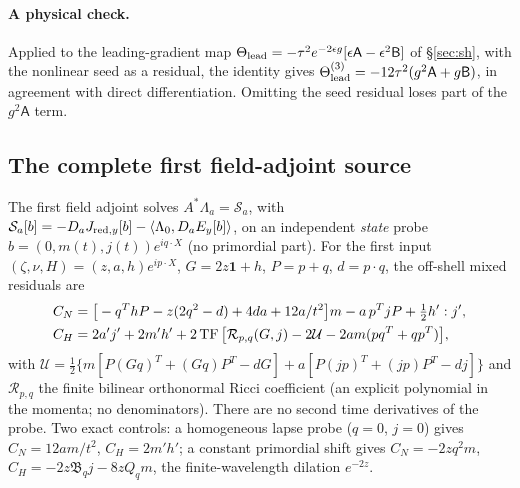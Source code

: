 \paragraph{A physical check.} Applied to the leading-gradient map
$\Theta_{\rm lead}=-\tau^2e^{-2\epsilon g}[\epsilon\mathsf A-\epsilon^2\mathsf B]$ of \S\ref{sec:sh}, with the
nonlinear seed as a residual, the identity gives $\Theta^{(3)}_{\rm lead}=-12\tau^2(g^2\mathsf A+g\mathsf B)$,
in agreement with direct differentiation. Omitting the seed residual loses part of the
$g^2\mathsf A$ term.

\subsection{The complete first field-adjoint source}\label{sec:first-source}
The first field adjoint solves $A^*\Lambda_a=\mathcal S_a$, with
$\mathcal S_a[b]=-D_aJ_{{\rm red},y}[b]-\langle\Lambda_0,D_aE_y[b]\rangle$, on an independent
\emph{state} probe $b=(0,m(t),j(t))e^{iq\cdot X}$ (no primordial part). For the first input
$(\zeta,\nu,H)=(z,a,h)e^{ip\cdot X}$, $G=2z\mathbf 1+h$, $P=p+q$, $d=p\cdot q$, the off-shell
mixed residuals are
\begin{equation}\label{eq:mixed-residuals}
\begin{split}
 C_N&=\big[-q^ThP-z(2q^2-d)+4da+12a/t^2\big]m-a\,p^TjP+\tfrac12h':j',\\
 C_H&=2a'j'+2m'h'+2\operatorname{TF}\big[\mathcal R_{p,q}(G,j)-2\mathcal U-2am(pq^T+qp^T)\big],
\end{split}
\end{equation}
with $\mathcal U=\frac12\{m[P(Gq)^T+(Gq)P^T-dG]+a[P(jp)^T+(jp)P^T-dj]\}$ and
$\mathcal R_{p,q}$ the finite bilinear orthonormal Ricci coefficient (an explicit polynomial in
the momenta; no denominators). There are no second time derivatives of the probe. Two exact
controls: a homogeneous lapse probe ($q=0$, $j=0$) gives $C_N=12am/t^2$, $C_H=2m'h'$; a constant primordial shift
gives $C_N=-2zq^2m$, $C_H=-2z\mathfrak B_qj-8zQ_qm$, the finite-wavelength dilation $e^{-2z}$.

